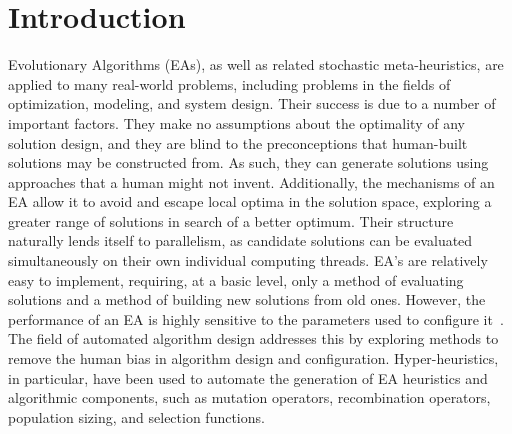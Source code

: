 \documentclass[sigconf]{acmart}
\begin{document}



\maketitle


\section{Introduction}
\label{Introduction}
Evolutionary Algorithms (EAs), as well as related stochastic meta-heuristics, are applied to many real-world problems, including problems in the fields of optimization, modeling, and system design. Their success is due to a number of important factors. They make no assumptions about the optimality of any solution design, and they are blind to the preconceptions that human-built solutions may be constructed from. As such, they can generate solutions using approaches that a human might not invent. Additionally, the mechanisms of an EA allow it to avoid and escape local optima in the solution space, exploring a greater range of solutions in search of a better optimum. Their structure naturally lends itself to parallelism, as candidate solutions can be evaluated simultaneously on their own individual computing threads. EA's are relatively easy to implement, requiring, at a basic level, only a method of evaluating solutions and a method of building new solutions from old ones. However, the performance of an EA is highly sensitive to the parameters used to configure it~\citep{eiben1999parameter}. The field of automated algorithm design addresses this by exploring methods to remove the human bias in algorithm design and configuration. Hyper-heuristics, in particular, have been used to automate the generation of EA heuristics and algorithmic components, such as mutation operators, recombination operators, population sizing, and selection functions.
\end{document}
